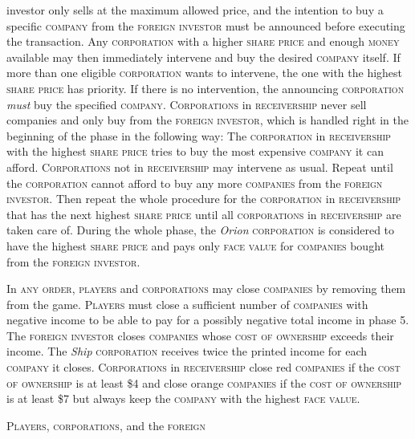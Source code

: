 \documentclass[11pt,a4paper]{article}
\newcounter{itemcounter}
\newenvironment{my_enumerate}
{\begin{list}{\arabic{itemcounter}.}
  {\usecounter{itemcounter}\leftmargin=1.8em}
  \setlength{\itemsep}{1pt}
  \setlength{\parskip}{0pt}
  \setlength{\parsep}{0pt}
}
{\end{list}}
\begin{document}
\begin{multicols}{2}
{\begin{my_enumerate}
{    investor} only sells at the maximum allowed price, and the
  intention to buy a specific \textsc{company} from the
  \textsc{foreign investor} must be announced before executing the
  transaction. Any \textsc{corporation} with a higher \textsc{share
    price} and enough \textsc{money} available may then immediately
  intervene and buy the desired \textsc{company} itself. If more than
  one eligible \textsc{corporation} wants to intervene, the one with
  the highest \textsc{share price} has priority. If there is no
  intervention, the announcing \textsc{corporation} \emph{must} buy
  the specified \textsc{company}. \textsc{Corporations} in
  \textsc{receivership} never sell companies and only buy from the
  \textsc{foreign investor}, which is handled right in the beginning
  of the phase in the following way: The \textsc{corporation} in
  \textsc{receivership} with the highest \textsc{share price} tries to
  buy the most expensive \textsc{company} it can
  afford. \textsc{Corporations} not in \textsc{receivership} may
  intervene as usual. Repeat until the \textsc{corporation} cannot
  afford to buy any more \textsc{companies} from the \textsc{foreign
    investor}. Then repeat the whole procedure for the
  \textsc{corporation} in \textsc{receivership} that has the next
  highest \textsc{share price} until all \textsc{corporations} in
  \textsc{receivership} are taken care of. During the whole phase, the
  \emph{Orion} \textsc{corporation} is considered to have the highest
  \textsc{share price} and pays only \textsc{face value} for
  \textsc{companies} bought from the \textsc{foreign investor}.
\item In \textsc{any order}, \textsc{players} and
  \textsc{corporations} may close \textsc{companies} by removing them
  from the game. \textsc{Players} must close a sufficient number of
  \textsc{companies} with negative income to be able to pay for a
  possibly negative total income in phase 5. The \textsc{foreign
    investor} closes \textsc{companies} whose \textsc{cost of
    ownership} exceeds their income. The \emph{Ship}
  \textsc{corporation} receives twice the printed income for each
  \textsc{company} it closes. \textsc{Corporations} in
  \textsc{receivership} close red \textsc{companies} if the
  \textsc{cost of ownership} is at least \$4 and close orange
  \textsc{companies} if the \textsc{cost of ownership} is at least \$7
  but always keep the \textsc{company} with the highest \textsc{face
    value}.
\item \textsc{Players}, \textsc{corporations}, and the \textsc{foreign
}
\end{my_enumerate}}
\end{multicols}
\end{document}
